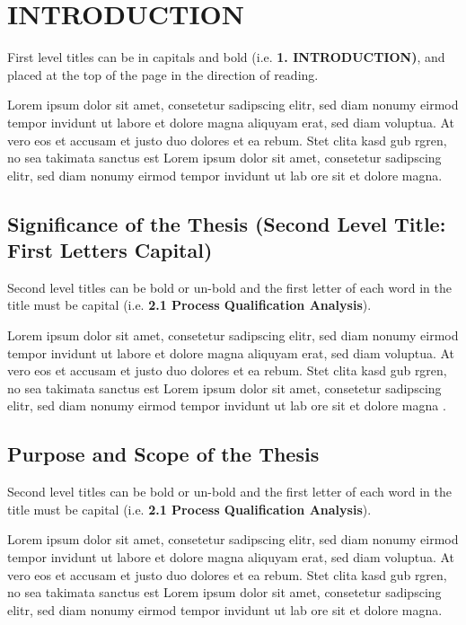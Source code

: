 \chapter{INTRODUCTION}\label{Ch1}
First level titles can be in capitals and bold (i.e. \textbf{1. INTRODUCTION)}, and placed at the top of the page in the direction of reading.

Lorem ipsum dolor sit amet, consetetur sadipscing elitr, sed diam nonumy eirmod tempor invidunt ut labore et dolore magna aliquyam erat, sed diam voluptua. At vero eos et accusam et justo duo dolores et ea rebum. Stet clita kasd gub rgren, no sea takimata sanctus est  Lorem ipsum dolor sit amet, consetetur sadipscing elitr,  sed diam nonumy eirmod tempor invidunt ut lab  ore sit et dolore magna.

\section{Significance of the Thesis (Second Level Title: First Letters Capital)}\label{significanceofthesis}

Second level titles can be bold or un-bold and the first letter of each word in the title must be capital (i.e. \textbf{2.1 Process Qualification Analysis}).

Lorem ipsum dolor sit amet, consetetur sadipscing elitr, sed diam nonumy eirmod tempor invidunt ut labore et dolore magna aliquyam erat, sed diam voluptua. At vero eos et accusam et justo duo dolores et ea rebum. Stet clita kasd gub rgren, no sea takimata sanctus est Lorem ipsum dolor sit amet, consetetur sadipscing elitr, sed diam nonumy eirmod tempor invidunt ut lab ore sit et dolore magna \cite{Cutler2015}.

\section{Purpose and Scope of the Thesis }\label{purposeofthesis}

Second level titles can be bold or un-bold and the first letter of each word in the title must be capital (i.e. \textbf{2.1 Process Qualification Analysis}).

Lorem ipsum dolor sit amet, consetetur sadipscing elitr, sed diam nonumy eirmod tempor invidunt ut labore et dolore magna aliquyam erat, sed diam voluptua. At vero eos et accusam et justo duo dolores et ea rebum. Stet clita kasd gub rgren, no sea takimata sanctus est Lorem ipsum dolor sit amet, consetetur sadipscing elitr, sed diam nonumy eirmod tempor invidunt ut lab ore sit et dolore magna.

